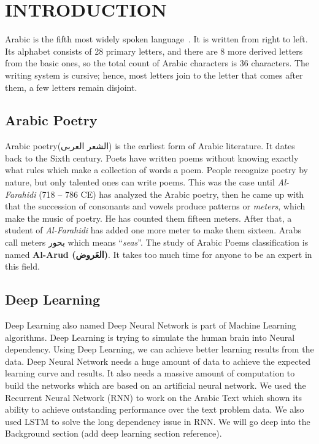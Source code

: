 \chapter{\uppercase{Introduction}}



 

  Arabic is the fifth most widely spoken language~\cite{Ethnologue_2017}. It is written from right to left. Its
alphabet consists of 28 primary letters, and there are 8 more derived letters
from the basic ones, so the total count of Arabic characters is 36 characters.
The writing system is cursive; hence, most letters join to the letter that comes
after them, a few letters remain disjoint.

\section{Arabic Poetry } %
Arabic poetry(\textarabic{الشعر العربى}) is the earliest form of Arabic literature. It dates back to the Sixth century. Poets have written poems without knowing exactly what rules which make a collection of words a poem. People recognize poetry by nature, but only talented ones can write poems. This was the case until \textit{Al-Farahidi} (718 – 786 CE) has analyzed the
Arabic poetry, then he came up with that the succession of consonants and vowels
produce patterns or \textit{meters}, which make the music of poetry.  He has
counted them fifteen meters.  After that, a student of \textit{Al-Farahidi} has
added one more meter to make them sixteen. Arabs call meters \textarabic{بحور}
which means ``\textit{seas}''. The study of Arabic Poems classification is named \textbf{Al-Arud (\textarabic{العَروض})}. It takes too much time for anyone to be an expert in this field. 
\section{Deep Learning}

Deep Learning also named Deep Neural Network is part of Machine Learning algorithms. Deep Learning is trying to simulate the human brain into Neural dependency.  Using Deep Learning, we can achieve better learning results from the data. Deep Neural Network needs a huge amount of data to achieve the expected learning curve and results. It also needs a massive amount of computation to build the networks which are based on an artificial neural network. We used the Recurrent Neural Network (RNN) to work on the Arabic Text which shown its ability to achieve outstanding performance over the text problem data. We also used LSTM to solve the long dependency issue in RNN. We will go deep into the Background section (add deep learning section reference).


